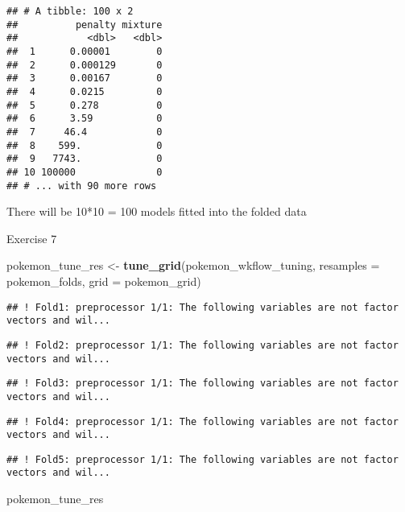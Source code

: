 \documentclass[]{article}
\newenvironment{Shaded}{\begin{snugshade}}{\end{snugshade}}
\newcommand{\DataTypeTok}[1]{\textcolor[rgb]{0.13,0.29,0.53}{#1}}
\newcommand{\KeywordTok}[1]{\textcolor[rgb]{0.13,0.29,0.53}{\textbf{#1}}}
\newcommand{\NormalTok}[1]{#1}
\newcommand{\StringTok}[1]{\textcolor[rgb]{0.31,0.60,0.02}{#1}}
\begin{document}
\begin{verbatim}
## # A tibble: 100 x 2
##          penalty mixture
##            <dbl>   <dbl>
##  1      0.00001        0
##  2      0.000129       0
##  3      0.00167        0
##  4      0.0215         0
##  5      0.278          0
##  6      3.59           0
##  7     46.4            0
##  8    599.             0
##  9   7743.             0
## 10 100000              0
## # ... with 90 more rows
\end{verbatim}

There will be 10*10 = 100 models fitted into the folded data

Exercise 7

\begin{Shaded}
\begin{Highlighting}[]
\NormalTok{pokemon_tune_res <-}\StringTok{ }\KeywordTok{tune_grid}\NormalTok{(pokemon_wkflow_tuning, }\DataTypeTok{resamples =}\NormalTok{ pokemon_folds, }\DataTypeTok{grid =}\NormalTok{ pokemon_grid)}
\end{Highlighting}
\end{Shaded}

\begin{verbatim}
## ! Fold1: preprocessor 1/1: The following variables are not factor vectors and wil...
\end{verbatim}

\begin{verbatim}
## ! Fold2: preprocessor 1/1: The following variables are not factor vectors and wil...
\end{verbatim}

\begin{verbatim}
## ! Fold3: preprocessor 1/1: The following variables are not factor vectors and wil...
\end{verbatim}

\begin{verbatim}
## ! Fold4: preprocessor 1/1: The following variables are not factor vectors and wil...
\end{verbatim}

\begin{verbatim}
## ! Fold5: preprocessor 1/1: The following variables are not factor vectors and wil...
\end{verbatim}

\begin{Shaded}
\begin{Highlighting}[]
\NormalTok{pokemon_tune_res}
\end{Highlighting}
\end{Shaded}
\end{document}

